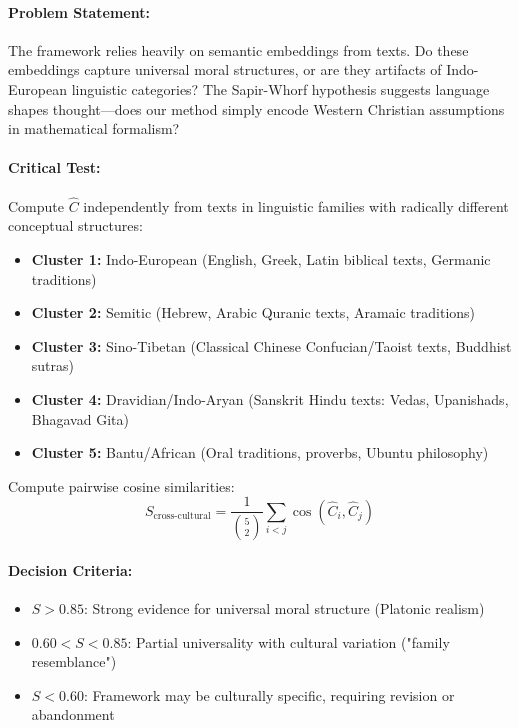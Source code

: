 \documentclass[11pt,a4paper]{article}
\theoremstyle{definition}
\theoremstyle{remark}
\begin{document}
\paragraph{Problem Statement:} 
The framework relies heavily on semantic embeddings from texts. Do these embeddings capture universal moral structures, or are they artifacts of Indo-European linguistic categories? The Sapir-Whorf hypothesis suggests language shapes thought—does our method simply encode Western Christian assumptions in mathematical formalism?

\paragraph{Critical Test:} 
Compute \(\hat{C}\) independently from texts in linguistic families with radically different conceptual structures:
\begin{itemize}
    \item \textbf{Cluster 1:} Indo-European (English, Greek, Latin biblical texts, Germanic traditions)
    \item \textbf{Cluster 2:} Semitic (Hebrew, Arabic Quranic texts, Aramaic traditions)
    \item \textbf{Cluster 3:} Sino-Tibetan (Classical Chinese Confucian/Taoist texts, Buddhist sutras)
    \item \textbf{Cluster 4:} Dravidian/Indo-Aryan (Sanskrit Hindu texts: Vedas, Upanishads, Bhagavad Gita)
    \item \textbf{Cluster 5:} Bantu/African (Oral traditions, proverbs, Ubuntu philosophy)
\end{itemize}

Compute pairwise cosine similarities:
\begin{equation}
S_{\text{cross-cultural}} = \frac{1}{\binom{5}{2}} \sum_{i < j} \cos(\hat{C}_i, \hat{C}_j)
\end{equation}

\paragraph{Decision Criteria:}
\begin{itemize}
    \item \(S > 0.85\): Strong evidence for universal moral structure (Platonic realism)
    \item \(0.60 < S < 0.85\): Partial universality with cultural variation ("family resemblance")
    \item \(S < 0.60\): Framework may be culturally specific, requiring revision or abandonment
\end{itemize}
\end{document}
